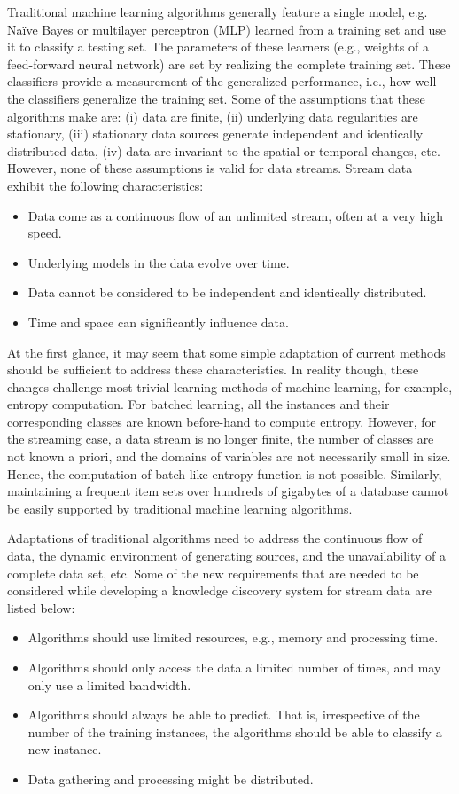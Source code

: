 Traditional machine learning algorithms generally feature a single model, e.g. Na\"ive Bayes or multilayer perceptron (MLP) learned from a training set and use it to classify a testing set. The parameters of these learners (e.g., weights of a feed-forward neural network) are set by realizing the complete training set. These classifiers provide a measurement of the generalized performance, i.e., how well the classifiers generalize the training set. Some of the assumptions that these algorithms make are: (i) data are finite, (ii) underlying data regularities are stationary, (iii) stationary data sources generate independent and identically distributed data, (iv) data are invariant to the spatial or temporal changes, etc. However, none of these assumptions is valid for data streams. Stream data exhibit the following characteristics: 
\begin{itemize}
    \item Data come as a continuous flow of an unlimited stream, often at a very high speed.
    \item Underlying models in the data evolve over time.
    \item Data cannot be considered to be independent and identically distributed.
    \item Time and space can significantly influence data.
\end{itemize}
At the first glance, it may seem that some simple adaptation of current methods should be sufficient to address these characteristics. In reality though, these changes challenge most trivial learning methods of machine learning, for example, entropy computation. For batched learning, all the instances and their corresponding classes are known before-hand to compute entropy. However, for the streaming case, a data stream is no longer finite, the number of classes are not known a priori, and the domains of variables are not necessarily small in size. Hence, the computation of batch-like entropy function is not possible. Similarly, maintaining a frequent item sets over hundreds of gigabytes of a database cannot be easily supported by traditional machine learning algorithms.

Adaptations of traditional algorithms need to address the continuous flow of data, the dynamic environment of generating sources, and the unavailability of a complete data set, etc. Some of the new requirements that are needed to be considered while developing a knowledge discovery system for stream data are listed below:
\begin{itemize}
    \item Algorithms should use limited resources, e.g., memory and processing time.
    \item Algorithms should only access the data a limited number of times, and may only use a limited bandwidth.
    \item Algorithms should always be able to predict. That is, irrespective of the number of the training instances, the algorithms should be able to classify a new instance.
    \item Data gathering and processing might be distributed.
\end{itemize}

